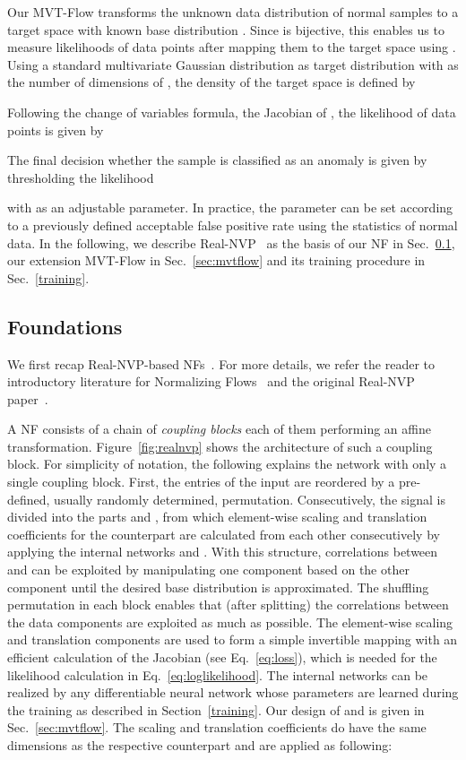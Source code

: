 \documentclass[journal]{IEEEtran}
\begin{document}
Our MVT-Flow  transforms the unknown data distribution  of normal samples  to a target space  with known {base} distribution .
Since  is bijective, this enables us to measure likelihoods of data points after mapping them to the target space using .
Using a standard multivariate Gaussian distribution  as target distribution with  as the number of dimensions of , the density of the target space is defined by

Following the change of variables formula, the Jacobian of , the likelihood of data points is given by 

The final decision whether the sample is classified as an anomaly is given by thresholding the likelihood

with  as an adjustable parameter.
{In practice, the parameter can be set according to a previously defined acceptable false positive rate using the statistics of normal data.
In the following, we describe Real-NVP~\cite{realnvp} as the basis of our NF in Sec.~\ref{sec:foundations}, our extension MVT-Flow in Sec.~\ref{sec:mvtflow} and its training procedure in Sec.~\ref{training}.}

\subsection{Foundations}
\label{sec:foundations}
We first recap Real-NVP-based NFs~\cite{realnvp}.
{For more details, we refer the reader to introductory literature for Normalizing Flows~\cite{papamakarios2021normalizing,kobyzev2020normalizing, nf} and the original Real-NVP paper~\cite{realnvp}.}

A NF consists of a chain of \textit{coupling blocks}  each of them performing an affine transformation.
Figure~\ref{fig:realnvp} shows the architecture of such a coupling block.
For simplicity of notation, the following explains the network with only a single coupling block.
First, the entries of the input  are reordered by a pre-defined, usually randomly determined, permutation.
Consecutively, the signal is divided into the parts  and , from which {element-wise} scaling and translation coefficients for the counterpart are calculated from each other consecutively by applying the internal networks  and  .
{With this structure, correlations between  and  can be exploited by manipulating one component based on the other component until the desired base distribution is approximated. 
The shuffling permutation in each block enables that (after splitting) the correlations between the data components are exploited as much as possible.
The element-wise scaling and translation components are used to form a simple invertible mapping with an efficient calculation of the Jacobian (see Eq.~\ref{eq:loss}), which is needed for the likelihood calculation in Eq.~\ref{eq:loglikelihood}.
The internal networks can be realized by any differentiable neural network whose parameters are learned during the training as described in Section~\ref{training}.
Our design of  and   is given in Sec.~\ref{sec:mvtflow}.}
The scaling and translation coefficients do have the same dimensions as the respective counterpart and are applied as following:
\end{document}
